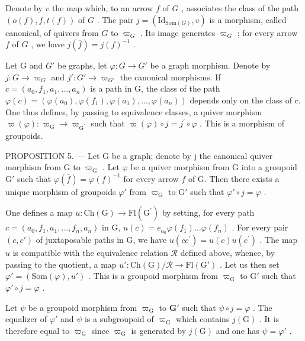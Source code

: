 Denote by \(v\) the map which, to an arrow \(f\) of \(G\) , associates the class of the path \((o(f), f, t(f))\) of \(G\) . The pair \(j = (\mathrm{Id}_{\mathrm{Som}(G)}, v)\) is a morphism, called canonical, of quivers from \(G\) to \(\varpi_G\) . Its image generates \(\varpi_G\) ; for every arrow \(f\) of \(G\) , we have \(j(\overline{f}) = j(f)^{-1}\) .

Let G and \(G'\) be graphs, let \(\varphi\colon G \to G'\) be a graph morphism. Denote by \(j\colon G \to \varpi_{G}\) and \(j'\colon G' \to \varpi_{G'}\) the canonical morphisms. If \(c = (a_0, f_1, a_1, \ldots, a_n)\) is a path in G, the class of the path \(\varphi(c) = (\varphi(a_0), \varphi(f_1), \varphi(a_1), \ldots, \varphi(a_n))\) depends only on the class of c. One thus defines, by passing to equivalence classes, a quiver morphism \(\varpi(\varphi)\colon\varpi_{\mathrm{G}}\to\varpi_{\mathrm{G}^{\prime}}\) such that \(\varpi(\varphi)\circ j=j^{\prime}\circ\varphi\) . This is a morphism of groupoids.

PROPOSITION 5. — Let G be a graph; denote by j the canonical quiver morphism from G to \(\varpi_{\mathrm{G}}\) . Let \(\varphi\) be a quiver morphism from G into a groupoid \(\mathrm{G}'\) such that \(\varphi(\overline{f}) = \varphi(f)^{-1}\) for every arrow \(f\) of G. Then there exists a unique morphism of groupoids \(\varphi'\) from \(\varpi_{\mathrm{G}}\) to \(\mathrm{G}'\) such that \(\varphi' \circ j = \varphi\) .

One defines a map \(u\colon \mathrm{Ch}(\mathrm{G})\to \mathrm{Fl}(\mathrm{G}^{\prime})\) by setting, for every path \(c = (a_0,f_1,a_1,\ldots ,f_n,a_n)\) in G, \(u(c) = e_{a_0}\varphi (f_1)\dots \varphi (f_n)\) . For every pair \((c,c')\) of juxtaposable paths in G, we have \(u(cc^{\prime}) = u(c)u(c^{\prime})\) . The map \(u\) is compatible with the equivalence relation \(\mathcal{R}\) defined above, whence, by passing to the quotient, a map \(u'\colon \mathrm{Ch}(\mathrm{G}) / \mathcal{R}\to \mathrm{Fl}(\mathrm{G}')\) . Let us then set \(\varphi ' = (\mathrm{Som}(\varphi),u')\) . This is a groupoid morphism from \(\varpi_{\mathrm{G}}\) to \(\mathrm{G}'\) such that \(\varphi '\circ j = \varphi\) .

Let \(\psi\) be a groupoid morphism from \(\varpi_{\mathrm{G}}\) to \(\mathbf{G}'\) such that \(\psi \circ j = \varphi\) . The equalizer of \(\varphi'\) and \(\psi\) is a subgroupoid of \(\varpi_{\mathrm{G}}\) which contains \(j(\mathrm{G})\) . It is therefore equal to \(\varpi_{\mathrm{G}}\) since \(\varpi_{\mathrm{G}}\) is generated by \(j(\mathrm{G})\) and one has \(\psi = \varphi'\) .

